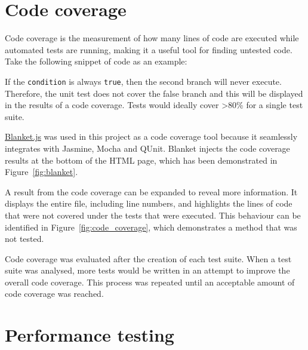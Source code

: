 \section{Code coverage} {
\label{sec:code_coverage}

	Code coverage is the measurement of how many lines of code are executed while automated tests are running, making it a useful tool for finding untested code. Take the following snippet of code as an example:

	

	If the \texttt{condition} is always \texttt{true}, then the second branch will never execute. Therefore, the unit test does not cover the false branch and this will be displayed in the results of a code coverage. Tests would ideally cover \textgreater80\% for a single test suite.

	\href{http://blanketjs.org/}{Blanket.js} was used in this project as a code coverage tool because it seamlessly integrates with Jasmine, Mocha and QUnit. Blanket injects the code coverage results at the bottom of the HTML page, which has been demonstrated in Figure~\ref{fig:blanket}.

	

	A result from the code coverage can be expanded to reveal more information. It displays the entire file, including line numbers, and highlights the lines of code that were not covered under the tests that were executed. This behaviour can be identified in Figure~\ref{fig:code_coverage}, which demonstrates a method that was not tested.

	

	Code coverage was evaluated after the creation of each test suite. When a test suite was analysed, more tests would be written in an attempt to improve the overall code coverage. This process was repeated until an acceptable amount of code coverage was reached.

}

\section{Performance testing} {
\label{sec:performance_testing}


}
